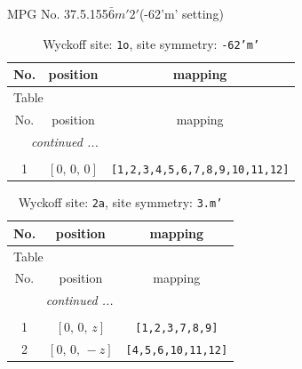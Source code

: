\documentclass[fleqn,8pt]{jsarticle}
\begin{document}
\setcounter{MaxMatrixCols}{32}

\renewcommand{\tablename}{Table~}
\renewcommand{\figurename}{Figure~}
\begin{center}
\LARGE
MPG No. 37.5.155\quad$\bar{6}m'2'$\quad(-62'm' setting)
\end{center}
\renewcommand{\arraystretch}{1.2}
\begin{longtable}{ccc}
\caption{Wyckoff site: {\tt 1o}, site symmetry: {\tt -62'm'}}
 \\
 \hline \hline
No. & position & mapping \\ \hline \endfirsthead

\multicolumn{2}{l}{\tablename\ \thetable{}} \\
 \hline \hline
No. & position & mapping \\ \hline \endhead

 \hline \hline
\multicolumn{2}{r}{\footnotesize\it continued ...} \\ \endfoot

 \hline \hline
\multicolumn{2}{r}{} \\ \endlastfoot

1 & $\left[ 0,\, 0,\, 0 \right]$ & {\tt [1,2,3,4,5,6,7,8,9,10,11,12]} \\
\end{longtable}
\renewcommand{\arraystretch}{1.2}
\begin{longtable}{ccc}
\caption{Wyckoff site: {\tt 2a}, site symmetry: {\tt 3.m'}}
 \\
 \hline \hline
No. & position & mapping \\ \hline \endfirsthead

\multicolumn{2}{l}{\tablename\ \thetable{}} \\
 \hline \hline
No. & position & mapping \\ \hline \endhead

 \hline \hline
\multicolumn{2}{r}{\footnotesize\it continued ...} \\ \endfoot

 \hline \hline
\multicolumn{2}{r}{} \\ \endlastfoot

1 & $\left[ 0,\, 0,\, z \right]$ & {\tt [1,2,3,7,8,9]} \\ \hline
2 & $\left[ 0,\, 0,\, - z \right]$ & {\tt [4,5,6,10,11,12]} \\
\end{longtable}
\renewcommand{\arraystretch}{1.2}
\end{document}
